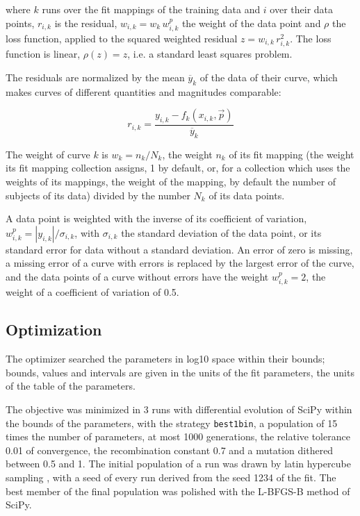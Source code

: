\documentclass{article}
\begin{document}
where $k$ runs over the fit mappings of the training data and $i$ over their data points, $r_{i,k}$ is the residual, $w_{i,k} = w_k\, w^{p}_{i,k}$ the weight of the data point and $\rho$ the loss function, applied to the squared weighted residual $z = w_{i,k}\, r_{i,k}^2$. The loss function is linear, $\rho(z) = z$, i.e. a standard least squares problem.

The residuals are normalized by the mean $\overline{y}_k$ of the data of their curve, which makes curves of different quantities and magnitudes comparable:

\begin{equation}
r_{i,k} = \frac{y_{i,k} - f_k(x_{i,k}, \vec{p})}{\overline{y}_k}
\end{equation}

The weight of curve $k$ is $w_k = n_k / N_k$, the weight $n_k$ of its fit mapping (the weight its fit mapping collection assigns, 1 by default, or, for a collection which uses the weights of its mappings, the weight of the mapping, by default the number of subjects of its data) divided by the number $N_k$ of its data points.

A data point is weighted with the inverse of its coefficient of variation, $w^{p}_{i,k} = |y_{i,k}| / \sigma_{i,k}$, with $\sigma_{i,k}$ the standard deviation of the data point, or its standard error for data without a standard deviation. An error of zero is missing, a missing error of a curve with errors is replaced by the largest error of the curve, and the data points of a curve without errors have the weight $w^{p}_{i,k} = 2$, the weight of a coefficient of variation of 0.5.

\subsection{Optimization}

The optimizer searched the parameters in log10 space within their bounds; bounds, values and intervals are given in the units of the fit parameters, the units of the table of the parameters.

The objective was minimized in 3 runs with differential evolution \cite{Storn1997} of SciPy \cite{Virtanen2020} within the bounds of the parameters, with the strategy \texttt{best1bin}, a population of 15 times the number of parameters, at most 1000 generations, the relative tolerance 0.01 of convergence, the recombination constant 0.7 and a mutation dithered between 0.5 and 1. The initial population of a run was drawn by latin hypercube sampling \cite{McKay1979}, with a seed of every run derived from the seed 1234 of the fit. The best member of the final population was polished with the L-BFGS-B method of SciPy.
\end{document}
